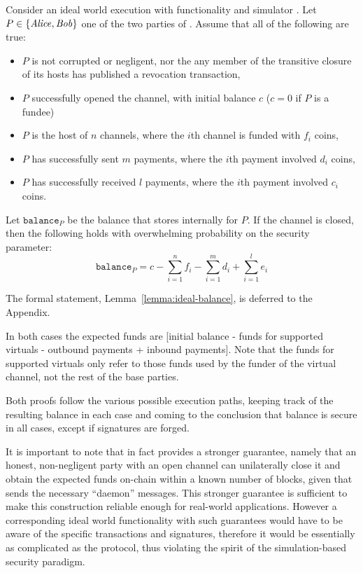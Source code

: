 \begin{lemma}
\label{lemma:ideal-balance-informal}
  Consider an ideal world execution with functionality \fchan and simulator
  \simulator. Let $P \in \{\mathit{Alice}, \mathit{Bob}\}$ one of the two parties of \fchan.
  Assume that all of the following are true:
  \begin{itemize}
    \item $P$ is not corrupted or negligent, nor the any member of the
    transitive closure of its hosts has published a revocation
    transaction,
    \item $P$ successfully opened the channel, with initial balance $c$ ($c = 0$
    if $P$ is a fundee)
    \item $P$ is the host of $n$ channels, where the $i$th channel is funded
    with $f_i$ coins,
    \item $P$ has successfully sent $m$ payments, where the $i$th payment
    involved $d_i$ coins,
    \item $P$ has successfully received $l$ payments, where the $i$th payment
    involved $c_i$ coins.
  \end{itemize}
  Let $\texttt{balance}_P$ be the balance that \fchan stores internally for $P$.
  If the channel is closed, then the following holds with overwhelming
  probability on the security parameter:
  \begin{equation}
    \texttt{balance}_P = c - \sum\limits_{i=1}^n f_i -
    \sum\limits_{i=1}^m d_i + \sum\limits_{i=1}^l e_i
  \end{equation}
\end{lemma}
The formal statement, Lemma~\ref{lemma:ideal-balance}, is deferred to the
Appendix.

  In both cases the expected funds are [initial balance -
  funds for supported virtuals - outbound payments + inbound payments]. Note
  that the funds for supported virtuals only refer to those funds used by the
  funder of the virtual channel, not the rest of the base parties.

  Both proofs follow the various possible execution paths, keeping track of the
  resulting balance in each case and coming to the conclusion that balance is
  secure in all cases, except if signatures are forged.

  It is important to note that in fact \pchan provides a stronger guarantee,
  namely that an honest, non-negligent party with an open channel can
  unilaterally close it and obtain the expected funds on-chain within a known
  number of blocks, given that \environment sends the necessary ``daemon'' messages.
  This stronger guarantee is sufficient to make this construction reliable
  enough for real-world applications. However a corresponding ideal world
  functionality with such guarantees would have to be aware of the specific
  transactions and signatures, therefore it would be essentially as complicated
  as the protocol, thus violating the spirit of the simulation-based security
  paradigm.

